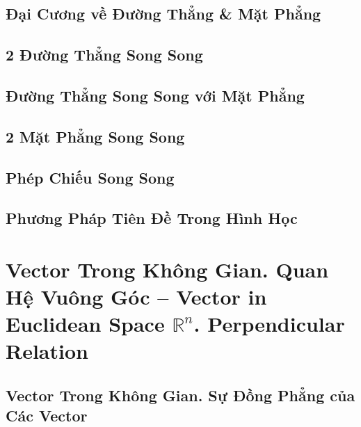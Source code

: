 \documentclass[oneside]{book}
\numberwithin{equation}{section}
\begin{document}
\section{Đại Cương về Đường Thẳng \& Mặt Phẳng}


\section{2 Đường Thẳng Song Song}


\section{Đường Thẳng Song Song với Mặt Phẳng}


\section{2 Mặt Phẳng Song Song}


\section{Phép Chiếu Song Song}


\section{Phương Pháp Tiên Đề Trong Hình Học}


\chapter{Vector Trong Không Gian. Quan Hệ Vuông Góc -- Vector in Euclidean Space $\mathbb{R}^n$. Perpendicular Relation}

\section{Vector Trong Không Gian. Sự Đồng Phẳng của Các Vector}
\end{document}
